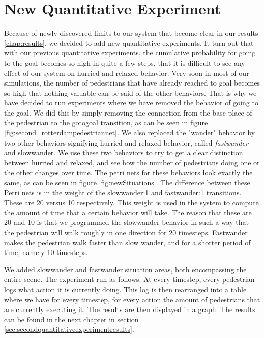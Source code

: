 \documentclass[11pt]{book}
\begin{document}
\section{New Quantitative Experiment}
\label{sec:quantitativeexp2}
Because of newly discovered limits to our system that become clear in our results \ref{chap:results}, we decided to add new quantitative experiments. It turn out that with our previous quantitative experiments, the cumulative probability for going to the goal becomes so high in quite a few steps, that it is difficult to see any effect of our system on hurried and relaxed behavior. Very soon in most of our simulations, the number of pedestrians that have already reached to goal becomes so high that nothing valuable can be said of the other behaviors. That is why we have decided to run experiments where we have removed the behavior of going to the goal. We did this by simply removing the connection from the base place of the pedestrian to the gotogoal transition, as can be seen in figure \ref{fig:second_rotterdampedestriannet}.
We also replaced the "wander" behavior by two other behaviors signifying hurried and relaxed behavior, called \emph{fastwander} and {slowwander}. We use these two behaviors to try to get a clear distinction between hurried and relaxed, and see how the number of pedestrians doing one or the other changes over time. The petri nets for these behaviors look exactly the same, as can be seen in figure \ref{fig:newSituations}. The difference between these Petri nets is in the weight of the slowwander:1 and fastwander:1 transitions. These are 20 versus 10 respectively. This weight is used in the system to compute the amount of time that a certain behavior will take. The reason that these are 20 and 10 is that we programmed the slowwander behavior in such a way that the pedestrian will walk roughly in one direction for 20 timesteps. Fastwander makes the pedestrian walk faster than slow wander, and for a shorter period of time, namely 10 timesteps.

We added slowwander and fastwander situation areas, both encompassing the entire scene.
The experiment run as follows. At every timestep, every pedestrian logs what action it is currently doing. This log is then rearranged into a table where we have for every timestep, for every action the amount of pedestrians that are currently executing it. The results are then displayed in a graph. The results can be found in the next chapter in section \ref{sec:secondquantitativeexperimentresults}.
\end{document}
